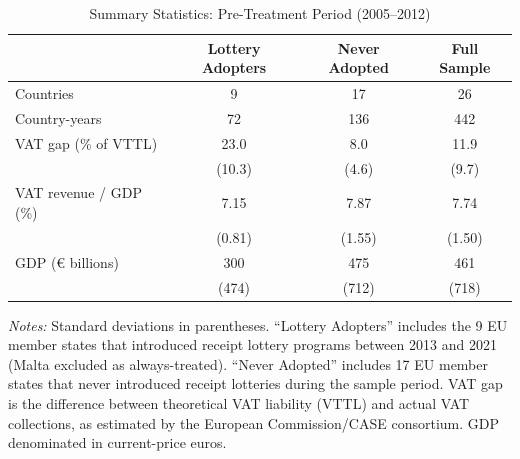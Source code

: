 \begin{table}[htbp]
\centering
\caption{Summary Statistics: Pre-Treatment Period (2005--2012)}
\label{tab:summary}
\begin{threeparttable}
\begin{tabular}{lccc}
\hline\hline
 & Lottery Adopters & Never Adopted & Full Sample \\
\hline
Countries & 9 & 17 & 26 \\
Country-years & 72 & 136 & 442 \\
\addlinespace
VAT gap (\% of VTTL) & 23.0 & 8.0 & 11.9 \\
 & (10.3) & (4.6) & (9.7) \\
VAT revenue / GDP (\%) & 7.15 & 7.87 & 7.74 \\
 & (0.81) & (1.55) & (1.50) \\
GDP (\euro{} billions) & 300 & 475 & 461 \\
 & (474) & (712) & (718) \\
\hline\hline
\end{tabular}
\begin{tablenotes}[flushleft]
\small
\item \textit{Notes:} Standard deviations in parentheses. ``Lottery Adopters'' includes the 9 EU member states that introduced receipt lottery programs between 2013 and 2021 (Malta excluded as always-treated). ``Never Adopted'' includes 17 EU member states that never introduced receipt lotteries during the sample period. VAT gap is the difference between theoretical VAT liability (VTTL) and actual VAT collections, as estimated by the European Commission/CASE consortium. GDP denominated in current-price euros.
\end{tablenotes}
\end{threeparttable}
\end{table}

